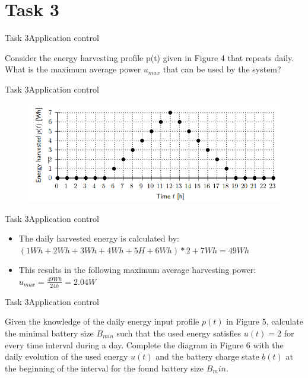 \section{Task 3}

\setcounter{task}{1}
\begin{frame}{Task 3}{Application control}
    \begin{tasknoinc}
        Consider the energy harvesting proﬁle p(t) given in Figure 4 that repeats daily. What is the maximum average power $u_{max}$ that can be used by the system?
    \end{tasknoinc}
\end{frame}
\begin{frame}{Task 3}{Application control}
    \begin{solutionnoinc}
        \begin{figure}
            \centering
            \includegraphics[scale=0.5]{figures/harvestingProfile.PNG}
        \end{figure}
    \end{solutionnoinc}
\end{frame}
\begin{frame}{Task 3}{Application control}
    \begin{solution}
        \begin{itemize}
            \item The daily harvested energy is calculated by: $(1Wh + 2Wh + 3Wh + 4Wh + 5H + 6Wh) * 2 + 7 Wh = 49Wh$
            \item This results in the following maximum average harvesting power: $u_{max} = \frac{49 Wh}{24h} = 2.04W$
        \end{itemize}
    \end{solution}
\end{frame}
\begin{frame}{Task 3}{Application control}
    \begin{tasknoinc}
        Given the knowledge of the daily energy input proﬁle $p(t)$ in Figure 5, calculate the minimal battery size $B_{min}$ such that the used energy satisﬁes $u(t) = 2$ for every time interval during a day. Complete the diagram in Figure 6 with the daily evolution of the used energy $u(t)$ and the battery charge state $b(t)$ at the beginning of the interval for the found battery size $B_min$.
    \end{tasknoinc}
\end{frame}
